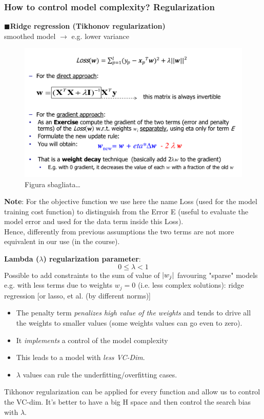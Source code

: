 \documentclass[../main.tex]{subfiles}
\begin{document}
\subsubsection{How to control model complexity? Regularization}
\noindent$\blacksquare$\textbf{Ridge regression (Tikhonov regularization)}\\
smoothed model $\rightarrow$ e.g. lower variance
\begin{figure}[H]
    \centering
    \includegraphics[scale = 0.3]{lectures/2_linear_model/tikhonov.png}
    \caption{Figura sbagliata\ldots}
    \label{fig:2_tikhonov}
\end{figure}
\textbf{Note}: For the objective function we use here the name Loss (used for the model training cost function) to distinguish from the Error E (useful to evaluate the model error and used for the data term inside this Loss).\\
Hence, differently from previous assumptions the two terms are not more equivalent in our use (in the course).

\textbf{Lambda ($\lambda$) regularization parameter}: 
$$ 0\leq \lambda < 1$$
Possible to add constraints to the sum of value of $\lvert w_j\rvert$ favouring "sparse" models e.g. with less terms due to weights $w_j=0$ (i.e. less complex solutions): ridge regression [or lasso, et al. (by different norms)]

\begin{itemize}
    \item The penalty term \emph{penalizes high value of the weights} and tends to drive all the weights to smaller values (some weights values can go even to zero).
    \item It \emph{implements} a control of the model complexity
    \item This leads to a model with \emph{less VC-Dim}.
    \item $\lambda$ values can rule the underfitting/overfitting cases.
\end{itemize}
Tikhonov regularization can be applied for every function and allow us to control the VC-dim. It's better to have a big H space and then control the search bias with $\lambda$.
\end{document}

